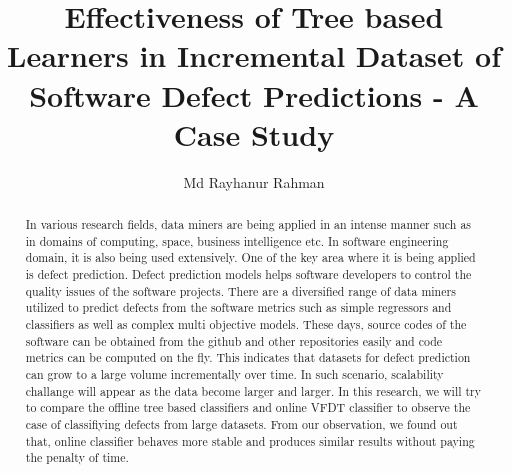 \documentclass[sigplan]{acmart}\settopmatter{printfolios=true,printccs=false,printacmref=false}
\begin{document}
\title[Effectiveness of Tree based Learners in Incremental Dataset of Software Defect Predictions - A Case Study]{Effectiveness of Tree based Learners in Incremental Dataset of Software Defect Predictions - A Case Study}         
\subtitle{}                    


\author{Md Rayhanur Rahman}



\begin{abstract}
In various research fields, data miners are being applied in an intense manner such as in domains of computing, space, business intelligence etc. In software engineering domain, it is also being used extensively. One of the key area where it is being applied is defect prediction. Defect prediction models helps software developers to control the quality issues of the software projects. There are a diversified range of data miners utilized to predict defects from the software metrics such as simple regressors and classifiers as well as complex multi objective models. These days, source codes of the software can be obtained from the github and other repositories easily and code metrics can be computed on the fly. This indicates that datasets for defect prediction can grow to a large volume incrementally over time. In such scenario, scalability challange will appear as the data become larger and larger. In this research, we will try to compare the offline tree based classifiers and online VFDT classifier to observe the case of classifiying defects from large datasets. From our observation, we found out that, online classifier behaves more stable and produces similar results without paying the penalty of time.  
\end{abstract}


\maketitle
\end{document}
